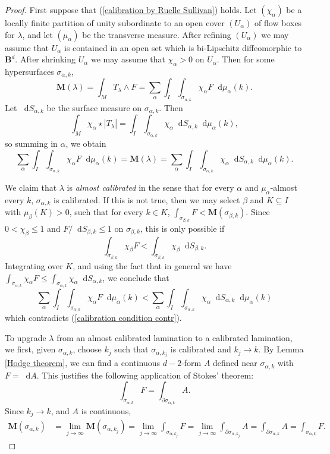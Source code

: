 \documentclass[reqno,11pt]{amsart}
\newcommand{\Ball}{\mathbf{B}}
\newcommand*\dif{\mathop{}\!\mathrm{d}}
\newcommand{\Mass}{\mathbf M}
\newcommand{\dfn}[1]{\emph{#1}\index{#1}}
\theoremstyle{definition}
\numberwithin{equation}{section}
\begin{document}
\begin{proof}
First suppose that (\ref{calibration by Ruelle Sullivan}) holds.
Let $(\chi_\alpha)$ be a locally finite partition of unity subordinate to an open cover $(U_\alpha)$ of flow boxes for $\lambda$, and let $(\mu_\alpha)$ be the transverse measure.
After refining $(U_\alpha)$ we may assume that $U_\alpha$ is contained in an open set which is bi-Lipschitz diffeomorphic to $\Ball^d$. After shrinking $U_\alpha$ we may assume that $\chi_\alpha > 0$ on $U_\alpha$.
Then for some hypersurfaces $\sigma_{\alpha,k}$,
$$\Mass(\lambda) = \int_M T_\lambda \wedge F = \sum_\alpha \int_I \int_{\sigma_{\alpha,k}} \chi_\alpha F \dif \mu_\alpha(k).$$
Let $\dif S_{\alpha,k}$ be the surface measure on $\sigma_{\alpha,k}$. Then
$$\int_M \chi_\alpha \star |T_\lambda| = \int_I \int_{\sigma_{\alpha,k}} \chi_\alpha \dif S_{\alpha,k} \dif \mu_\alpha(k),$$
so summing in $\alpha$, we obtain 
\begin{equation}\label{calibration condition contr}
\sum_\alpha \int_I \int_{\sigma_{\alpha,k}} \chi_\alpha F \dif \mu_\alpha(k) = \Mass(\lambda) = \sum_\alpha \int_I \int_{\sigma_{\alpha,k}} \chi_\alpha \dif S_{\alpha,k} \dif \mu_\alpha(k).
\end{equation}

We claim that $\lambda$ is \dfn{almost calibrated} in the sense that for every $\alpha$ and $\mu_\alpha$-almost every $k$, $\sigma_{\alpha, k}$ is calibrated.
If this is not true, then we may select $\beta$ and $K \subseteq I$ with $\mu_\beta(K) > 0$, such that for every $k \in K$, $\int_{\sigma_{\beta, k}} F < \Mass(\sigma_{\beta, k})$.
Since $0 < \chi_\beta \leq 1$ and $F/\dif S_{\beta, k} \leq 1$ on $\sigma_{\beta, k}$, this is only possible if 
$$\int_{\sigma_{\beta, k}} \chi_\beta F < \int_{\sigma_{\beta, k}} \chi_\beta \dif S_{\beta, k}.$$
Integrating over $K$, and using the fact that in general we have $\int_{\sigma_{\alpha, k}} \chi_\alpha F \leq \int_{\sigma_{\alpha, k}} \chi_\alpha \dif S_{\alpha, k}$, we conclude that 
$$\sum_\alpha \int_I \int_{\sigma_{\alpha, k}} \chi_\alpha F \dif \mu_\alpha(k) < \sum_\alpha \int_I \int_{\sigma_{\alpha, k}} \chi_\alpha \dif S_{\alpha, k} \dif \mu_\alpha(k)$$
which contradicts (\ref{calibration condition contr}).

To upgrade $\lambda$ from an almost calibrated lamination to a calibrated lamination, we first, given $\sigma_{\alpha, k}$, choose $k_j$ such that $\sigma_{\alpha, k_j}$ is calibrated and $k_j \to k$.
By Lemma \ref{Hodge theorem}, we can find a continuous $d - 2$-form $A$ defined near $\sigma_{\alpha, k}$ with $F = \dif A$.
This justifies the following application of Stokes' theorem: 
$$\int_{\sigma_{\alpha, k}} F = \int_{\partial \sigma_{\alpha, k}} A.$$
Since $k_j \to k$, and $A$ is continuous,
\begin{align*}
\Mass(\sigma_{\alpha, k}) &= \lim_{j \to \infty} \Mass(\sigma_{\alpha, k_j}) = \lim_{j \to \infty} \int_{\sigma_{\alpha, k_j}} F = \lim_{j \to \infty} \int_{\partial \sigma_{\alpha, k_j}} A = \int_{\partial \sigma_{\alpha, k}} A = \int_{\sigma_{\alpha, k}} F.
\end{align*}


\end{proof}
\end{document}
